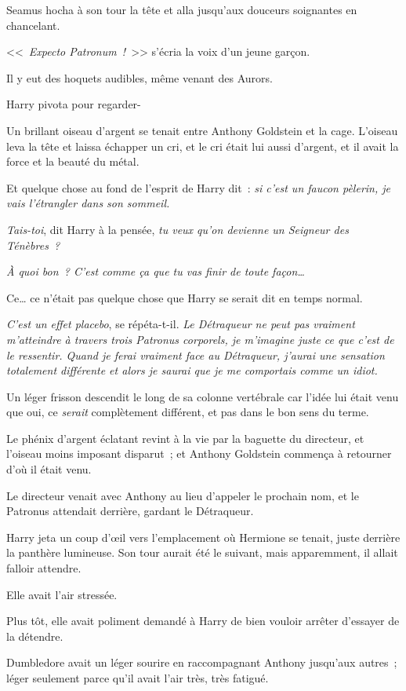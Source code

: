 Seamus hocha à son tour la tête et alla jusqu'aux douceurs soignantes en chancelant.

<<~\emph{Expecto Patronum~!}~>> s'écria la voix d'un jeune garçon.

Il y eut des hoquets audibles, même venant des Aurors.

Harry pivota pour regarder-

Un brillant oiseau d'argent se tenait entre Anthony Goldstein et la cage. L'oiseau leva la tête et laissa échapper un cri, et le cri était lui aussi d'argent, et il avait la force et la beauté du métal.

Et quelque chose au fond de l'esprit de Harry dit~: \emph{si c'est un faucon pèlerin, je vais l'étrangler dans son sommeil.}

\emph{Tais-toi}, dit Harry à la pensée, \emph{tu veux qu'on devienne un Seigneur des Ténèbres~?}

\emph{À quoi bon~? C'est comme ça que tu vas finir de toute façon…}

Ce… ce n'était pas quelque chose que Harry se serait dit en temps normal.

\emph{C'est un effet placebo}, se répéta-t-il. \emph{Le Détraqueur ne peut pas vraiment m'atteindre à travers trois Patronus corporels, je m'imagine juste ce que c'est de le ressentir. Quand je ferai vraiment face au Détraqueur, j'aurai une sensation totalement différente et alors je saurai que je me comportais comme un idiot.}

Un léger frisson descendit le long de sa colonne vertébrale car l'idée lui était venu que oui, ce \emph{serait} complètement différent, et pas dans le bon sens du terme.

Le phénix d'argent éclatant revint à la vie par la baguette du directeur, et l'oiseau moins imposant disparut~; et Anthony Goldstein commença à retourner d'où il était venu.

Le directeur venait avec Anthony au lieu d'appeler le prochain nom, et le Patronus attendait derrière, gardant le Détraqueur.

Harry jeta un coup d'œil vers l'emplacement où Hermione se tenait, juste derrière la panthère lumineuse. Son tour aurait été le suivant, mais apparemment, il allait falloir attendre.

Elle avait l'air stressée.

Plus tôt, elle avait poliment demandé à Harry de bien vouloir arrêter d'essayer de la détendre.

Dumbledore avait un léger sourire en raccompagnant Anthony jusqu'aux autres~; léger seulement parce qu'il avait l'air très, très fatigué.


